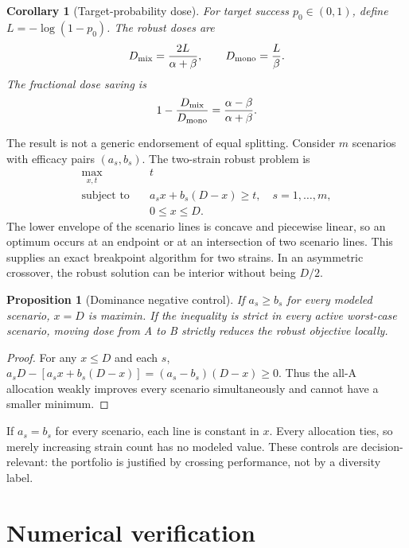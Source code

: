 \documentclass[10pt,twocolumn]{article}
\newtheorem{proposition}{Proposition}
\newtheorem{corollary}{Corollary}
\begin{document}
\begin{corollary}[Target-probability dose]
\label{cor:dose}
For target success $p_0\in(0,1)$, define $L=-\log(1-p_0)$. The robust doses are
\begin{equation}
 D_{\rm mix}=\frac{2L}{\alpha+\beta},\qquad
 D_{\rm mono}=\frac{L}{\beta}.
\end{equation}
The fractional dose saving is
\begin{equation}
 1-\frac{D_{\rm mix}}{D_{\rm mono}}
 =\frac{\alpha-\beta}{\alpha+\beta}.
 \label{eq:saving}
\end{equation}
\end{corollary}

The result is not a generic endorsement of equal splitting. Consider $m$
scenarios with efficacy pairs $(a_s,b_s)$. The two-strain robust problem is
\begin{align}
 \max_{x,t}\quad &t\\
 \text{subject to}\quad&a_s x+b_s(D-x)\ge t,\quad s=1,\ldots,m,\\
 &0\le x\le D.
 \label{eq:lp}
\end{align}
The lower envelope of the scenario lines is concave and piecewise linear, so an
optimum occurs at an endpoint or at an intersection of two scenario lines.
This supplies an exact breakpoint algorithm for two strains. In an asymmetric
crossover, the robust solution can be interior without being $D/2$.

\begin{proposition}[Dominance negative control]
\label{prop:dominance}
If $a_s\ge b_s$ for every modeled scenario, $x=D$ is maximin. If the inequality
is strict in every active worst-case scenario, moving dose from A to B strictly
reduces the robust objective locally.
\end{proposition}

\begin{proof}
For any $x\le D$ and each $s$,
$a_sD-[a_sx+b_s(D-x)]=(a_s-b_s)(D-x)\ge0$. Thus the all-A allocation weakly
improves every scenario simultaneously and cannot have a smaller minimum.
\end{proof}

If $a_s=b_s$ for every scenario, each line is constant in $x$. Every allocation
ties, so merely increasing strain count has no modeled value. These controls
are decision-relevant: the portfolio is justified by crossing performance, not
by a diversity label.

\section{Numerical verification}
\end{document}
